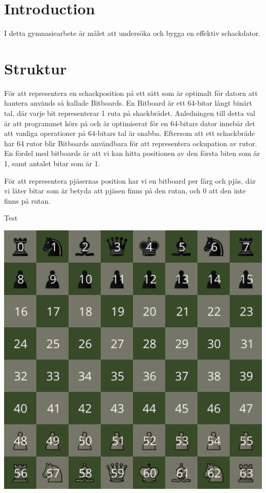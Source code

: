 \message{ !name(main.tex)}\documentclass{article}
\title{}
\author{Vilhelm Lindell}
\date{August 2024}
\begin{document}


\maketitle
\section{Introduction}
I detta gymnasiearbete är målet att undersöka och bygga en effektiv schackdator.
\section{Struktur}
För att representera en schackposition på ett sätt som är optimalt för datorn att hantera används så kallade Bitboards. En Bitboard är ett 64-bitar långt binärt tal, där varje bit representerar 1 ruta på shackbrädet. Anledningen till detta val är att programmet körs på och är optimiserat för en 64-bitars dator innebär det att vanliga operationer på 64-bitars tal är snabba. Eftersom att ett schackbräde har 64 rutor blir Bitboards användbara för att representera ockupation av rutor. En fördel med bitboards är att vi kan hitta positionen av den första biten som är 1, samt antalet bitar som är 1.

För att representera pjäsernas position har vi en bitboard per färg och pjäs, där vi låter bitar som är betyda att pjäsen finns på den rutan, och 0 att den inte finns på rutan.

Test



\includegraphics[scale=0.1]{board_indexed}
\end{document}
